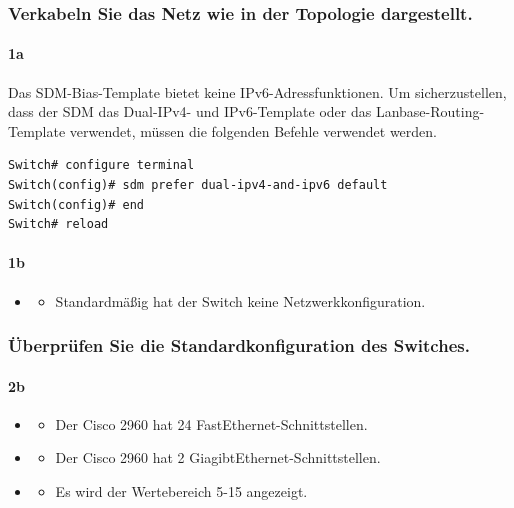 \documentclass[a4paper]{article}
\newcommand{\abc}{\hfill \break}
\begin{document}
\subsubsection{Verkabeln Sie das Netz wie in der Topologie dargestellt.} 
\paragraph{1a}\abc
Das SDM-Bias-Template bietet keine IPv6-Adressfunktionen. Um sicherzustellen, dass der SDM das Dual-IPv4- und IPv6-Template oder das Lanbase-Routing-Template verwendet, müssen die folgenden Befehle verwendet werden.
\begin{lstlisting}
Switch# configure terminal
Switch(config)# sdm prefer dual-ipv4-and-ipv6 default
Switch(config)# end
Switch# reload
\end{lstlisting}
\paragraph{1b} \abc
\begin{itemize}
	\item {} \abc
\begin{itemize}
	\item Standardmäßig hat der Switch keine Netzwerkkonfiguration.
\end{itemize}
\end{itemize}
\subsubsection{Überprüfen Sie die Standardkonfiguration des Switches.}
\paragraph{2b} \abc
\begin{itemize}
\item {} \abc
\begin{itemize}
\item Der Cisco 2960 hat 24 FastEthernet-Schnittstellen.\abc
\end{itemize}
\item {} \abc
\begin{itemize}
\item Der Cisco 2960 hat 2 GiagibtEthernet-Schnittstellen.\abc
\end{itemize}
\item {} \abc
\begin{itemize}
\item Es wird der Wertebereich 5-15 angezeigt. \abc
\end{itemize}
\end{itemize}
\end{document}
